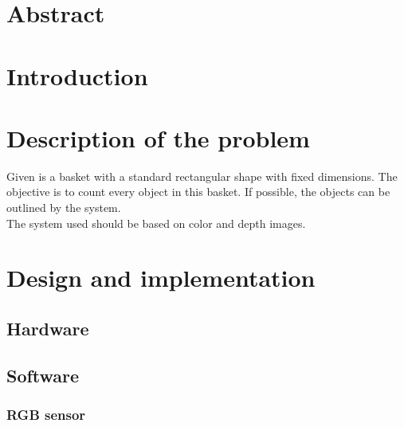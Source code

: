 \documentclass{article}
\begin{document}


\section*{Abstract}
\thispagestyle{empty}

\newpage
\tableofcontents
\thispagestyle{empty}

\newpage
\listoftables
\thispagestyle{empty}

\newpage
\listoffigures
\thispagestyle{empty}

\newpage
\section{Introduction}

\section{Description of the problem}

\hspace{\parindent} Given is a basket with a standard rectangular shape with fixed dimensions. The objective is to count every object in this basket. If possible, the objects can be outlined by the system.\\

\noindent The system used should be based on color and depth images.


\section{Design and implementation}
\subsection{Hardware}
\subsection{Software}
\subsubsection{RGB sensor}
\end{document}
